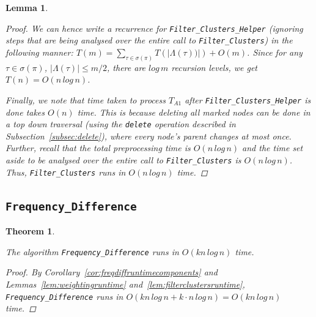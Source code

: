 \documentclass{article}
\newcommand{\leafset}{\Lambda}
\newtheorem{filterclustersruntime}[incompatibility]{Lemma}
\newtheorem{freqdiffruntime}[incompatibility]{Theorem}
\begin{document}
\begin{filterclustersruntime}
\begin{proof}
            We can hence write a recurrence for \texttt{Filter\_Clusters\_Helper} (ignoring steps that are being analysed over the entire call to \texttt{Filter\_Clusters}) in the following manner: $T(m) = \sum_{\tau \in \sigma(\pi)}T(|\leafset(\tau))|) + O(m)$. Since for any $\tau \in \sigma(\pi)$, $|\leafset(\tau)| \leq m/2$, there are $log\,m$ recursion levels, we get $T(n) = O(n\,log\,n)$.

            Finally, we note that time taken to process $T_{A1}$ after \texttt{Filter\_Clusters\_Helper} is done takes $O(n)$ time. This is because deleting all marked nodes can be done in a top down traversal (using the \texttt{delete} operation described in Subsection~\ref{subsec:delete}), where every node's parent changes at most once. Further, recall that the total preprocessing time is $O(n\,log\,n)$ and the time set aside to be analysed over the entire call to \texttt{Filter\_Clusters} is $O(n\,log\,n)$. Thus, \texttt{Filter\_Clusters} runs in $O(n\,log\,n)$ time.
        \end{proof}
    \end{filterclustersruntime}

    \subsection{\texttt{Frequency\_Difference}}

    \begin{freqdiffruntime}
        \label{theorem:freqdiffruntime}

        The algorithm \texttt{Frequency\_Difference} runs in $O(kn\,log\,n)$ time.

        \begin{proof}
            By Corollary~\ref{cor:freqdiffruntimecomponents} and Lemmas~\ref{lem:weightingruntime} and~\ref{lem:filterclustersruntime}, \texttt{Frequency\_Difference} runs in $O(kn\,log\,n + k \cdot n\,log\,n) = O(kn\,log\,n)$ time.
        \end{proof}
    \end{freqdiffruntime}

    \newpage
    
    
\end{document}
